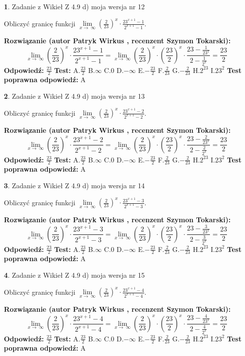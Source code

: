 \documentclass[12pt, a4paper]{article}
\theoremstyle{definition} %
\newtheorem{zad}{}
\newcommand{\zadStart}[1]{\begin{zad}#1\newline}
\newcommand{\zadStop}{\end{zad}}
\newcommand{\rozwStart}[2]{\noindent \textbf{Rozwiązanie (autor #1 , recenzent #2): }\newline}
\newcommand{\rozwStop}{\newline}
\newcommand{\odpStart}{\noindent \textbf{Odpowiedź:}\newline}
\newcommand{\odpStop}{\newline}
\newcommand{\testStart}{\noindent \textbf{Test:}\newline}
\newcommand{\testStop}{\newline}
\newcommand{\kluczStart}{\noindent \textbf{Test poprawna odpowiedź:}\newline}
\newcommand{\kluczStop}{\newline}
\begin{document}
\zadStart{Zadanie z Wikieł Z 4.9 d) moja wersja nr 12}


Obliczyć granicę funkcji  $\lim\limits_{x\to\ \infty}(\frac{2}{23})^{x}\cdot\frac{23^{x+1}-1}{2^{x+1}-1}$.
\zadStop
\rozwStart{Patryk Wirkus}{Szymon Tokarski}
$$\lim\limits_{x\to\ \infty}(\frac{2}{23})^{x}\cdot\frac{23^{x+1}-1}{2^{x+1}-1}=\lim\limits_{x\to\ \infty}(\frac{2}{23})^{x}\cdot(\frac{23}{2})^{x} \cdot \frac{23-\frac{1}{23^{x}}}{2-\frac{1}{2^{x}}} = \frac{23}{2}$$
\rozwStop
\odpStart
$\frac{23}{2}$
\odpStop
\testStart
A.$\frac{23}{2}$ B.$\infty$ C.$0$ D.$-\infty$ E.$-\frac{23}{2}$
F.$\frac{2}{23}$ G.$-\frac{2}{23}$
H.$2^{23}$
I.$23^{2}$
\testStop
\kluczStart
A
\kluczStop



\zadStart{Zadanie z Wikieł Z 4.9 d) moja wersja nr 13}


Obliczyć granicę funkcji  $\lim\limits_{x\to\ \infty}(\frac{2}{23})^{x}\cdot\frac{23^{x+1}-2}{2^{x+1}-2}$.
\zadStop
\rozwStart{Patryk Wirkus}{Szymon Tokarski}
$$\lim\limits_{x\to\ \infty}(\frac{2}{23})^{x}\cdot\frac{23^{x+1}-2}{2^{x+1}-2}=\lim\limits_{x\to\ \infty}(\frac{2}{23})^{x}\cdot(\frac{23}{2})^{x} \cdot \frac{23-\frac{2}{23^{x}}}{2-\frac{2}{2^{x}}} = \frac{23}{2}$$
\rozwStop
\odpStart
$\frac{23}{2}$
\odpStop
\testStart
A.$\frac{23}{2}$ B.$\infty$ C.$0$ D.$-\infty$ E.$-\frac{23}{2}$
F.$\frac{2}{23}$ G.$-\frac{2}{23}$
H.$2^{23}$
I.$23^{2}$
\testStop
\kluczStart
A
\kluczStop



\zadStart{Zadanie z Wikieł Z 4.9 d) moja wersja nr 14}


Obliczyć granicę funkcji  $\lim\limits_{x\to\ \infty}(\frac{2}{23})^{x}\cdot\frac{23^{x+1}-3}{2^{x+1}-3}$.
\zadStop
\rozwStart{Patryk Wirkus}{Szymon Tokarski}
$$\lim\limits_{x\to\ \infty}(\frac{2}{23})^{x}\cdot\frac{23^{x+1}-3}{2^{x+1}-3}=\lim\limits_{x\to\ \infty}(\frac{2}{23})^{x}\cdot(\frac{23}{2})^{x} \cdot \frac{23-\frac{3}{23^{x}}}{2-\frac{3}{2^{x}}} = \frac{23}{2}$$
\rozwStop
\odpStart
$\frac{23}{2}$
\odpStop
\testStart
A.$\frac{23}{2}$ B.$\infty$ C.$0$ D.$-\infty$ E.$-\frac{23}{2}$
F.$\frac{2}{23}$ G.$-\frac{2}{23}$
H.$2^{23}$
I.$23^{2}$
\testStop
\kluczStart
A
\kluczStop



\zadStart{Zadanie z Wikieł Z 4.9 d) moja wersja nr 15}


Obliczyć granicę funkcji  $\lim\limits_{x\to\ \infty}(\frac{2}{23})^{x}\cdot\frac{23^{x+1}-4}{2^{x+1}-4}$.
\zadStop
\rozwStart{Patryk Wirkus}{Szymon Tokarski}
$$\lim\limits_{x\to\ \infty}(\frac{2}{23})^{x}\cdot\frac{23^{x+1}-4}{2^{x+1}-4}=\lim\limits_{x\to\ \infty}(\frac{2}{23})^{x}\cdot(\frac{23}{2})^{x} \cdot \frac{23-\frac{4}{23^{x}}}{2-\frac{4}{2^{x}}} = \frac{23}{2}$$
\rozwStop
\odpStart
$\frac{23}{2}$
\odpStop
\testStart
A.$\frac{23}{2}$ B.$\infty$ C.$0$ D.$-\infty$ E.$-\frac{23}{2}$
F.$\frac{2}{23}$ G.$-\frac{2}{23}$
H.$2^{23}$
I.$23^{2}$
\testStop
\kluczStart
A
\kluczStop
\end{document}
